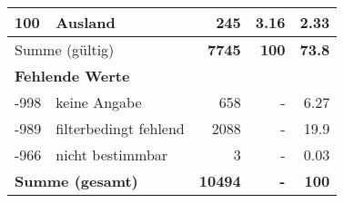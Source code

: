 \begin{longtable}{lXrrr}
     100 &
     \multicolumn{1}{X}{ Ausland   } &


       \num{245} &
       \num[round-mode=places,round-precision=2]{3,16} &
         \num[round-mode=places,round-precision=2]{2,33} \\
     \midrule
     \multicolumn{2}{l}{Summe (gültig)} &
       \textbf{\num{7745}} &
     \textbf{100} &
       \textbf{\num[round-mode=places,round-precision=2]{73,8}} \\
     \multicolumn{5}{l}{\textbf{Fehlende Werte}}\\
       -998 &
       keine Angabe &
         \num{658} &
        - &
         \num[round-mode=places,round-precision=2]{6,27} \\
       -989 &
       filterbedingt fehlend &
         \num{2088} &
        - &
         \num[round-mode=places,round-precision=2]{19,9} \\
       -966 &
       nicht bestimmbar &
         \num{3} &
        - &
         \num[round-mode=places,round-precision=2]{0,03} \\
     \midrule
     \multicolumn{2}{l}{\textbf{Summe (gesamt)}} &
          \textbf{\num{10494}} &
        \textbf{-} &
        \textbf{100} \\
     \bottomrule
     \end{longtable}
     
